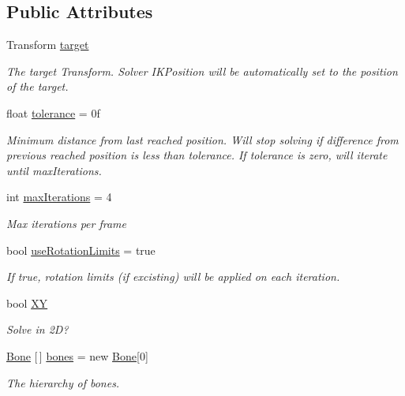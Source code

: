 \subsection*{Public Attributes}
\begin{DoxyCompactItemize}
\item 
Transform \mbox{\hyperlink{class_root_motion_1_1_final_i_k_1_1_i_k_solver_heuristic_a6d9cdc077be656f21ef52db556f810e5}{target}}
\begin{DoxyCompactList}\small\item\em The target Transform. Solver I\+K\+Position will be automatically set to the position of the target. \end{DoxyCompactList}\item 
float \mbox{\hyperlink{class_root_motion_1_1_final_i_k_1_1_i_k_solver_heuristic_a35b1d58890c707bcbb1586af8fd18a54}{tolerance}} = 0f
\begin{DoxyCompactList}\small\item\em Minimum distance from last reached position. Will stop solving if difference from previous reached position is less than tolerance. If tolerance is zero, will iterate until max\+Iterations. \end{DoxyCompactList}\item 
int \mbox{\hyperlink{class_root_motion_1_1_final_i_k_1_1_i_k_solver_heuristic_a1d8d6ed146e85d2595310e4e823a3dc8}{max\+Iterations}} = 4
\begin{DoxyCompactList}\small\item\em Max iterations per frame \end{DoxyCompactList}\item 
bool \mbox{\hyperlink{class_root_motion_1_1_final_i_k_1_1_i_k_solver_heuristic_aedb395011d886df6e4a534b30d6c7962}{use\+Rotation\+Limits}} = true
\begin{DoxyCompactList}\small\item\em If true, rotation limits (if excisting) will be applied on each iteration. \end{DoxyCompactList}\item 
bool \mbox{\hyperlink{class_root_motion_1_1_final_i_k_1_1_i_k_solver_heuristic_a231fb79dcb25a4717507124dfde88703}{XY}}
\begin{DoxyCompactList}\small\item\em Solve in 2D? \end{DoxyCompactList}\item 
\mbox{\hyperlink{class_root_motion_1_1_final_i_k_1_1_i_k_solver_1_1_bone}{Bone}} \mbox{[}$\,$\mbox{]} \mbox{\hyperlink{class_root_motion_1_1_final_i_k_1_1_i_k_solver_heuristic_af2f1ea1642dbe9276519e9bbabef2d9d}{bones}} = new \mbox{\hyperlink{class_root_motion_1_1_final_i_k_1_1_i_k_solver_1_1_bone}{Bone}}\mbox{[}0\mbox{]}
\begin{DoxyCompactList}\small\item\em The hierarchy of bones. \end{DoxyCompactList}\end{DoxyCompactItemize}
